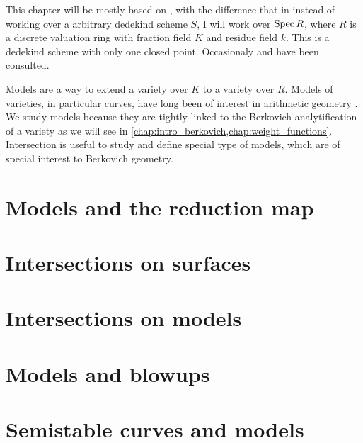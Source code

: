 This chapter will be mostly based on \cite[chap.\ 8, 9, 10]{liuAlgebraicGeometryArithmetic2002}, with the difference that in instead of working over a arbitrary dedekind scheme $S$, I will work over $\operatorname{Spec} R$, where $R$ is a discrete valuation ring with fraction field $K$ and residue field $k$. This is a dedekind scheme with only one closed point.  
Occasionaly \cite[appendix A]{hartshorneAlgebraicGeometry1977} and \cite[sec.\ III.7-8]{silvermanAdvancedTopicsArithmetic1994} have been consulted. 

Models are a way to extend a variety over $K$ to a variety over $R$. 
Models of varieties, in particular curves, have long been of interest in arithmetic geometry . 
We study models because they are tightly linked to the Berkovich analytification of a variety as we will see in \cref{chap:intro_berkovich,chap:weight_functions}. 
Intersection is useful to study and define special type of models, which are of special interest to Berkovich geometry.  

\section{Models and the reduction map} \label{sec:models}


\section{Intersections on surfaces} \label{sec:intersections_on_surfraces}


\section{Intersections on models} \label{sec:intersections_on_models}


\section{Models and blowups} \label{sec:models_and_blowups}


\section{Semistable curves and models} \label{sec:semistable_curves_and_models}




